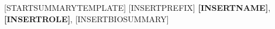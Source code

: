 


\def\NameFontstyle#1{\textbf{#1}}            %

[STARTSUMMARYTEMPLATE]
[INSERTPREFIX] \NameFontstyle{[INSERTNAME]}, \NameFontstyle{[INSERTROLE]}, [INSERTBIOSUMMARY] \par
[ENDSUMMARYTEMPLATE]

\newenvironment{[INSERTFILENAME]}{%
[INSERTSUMMARIES]
}
{%
}

